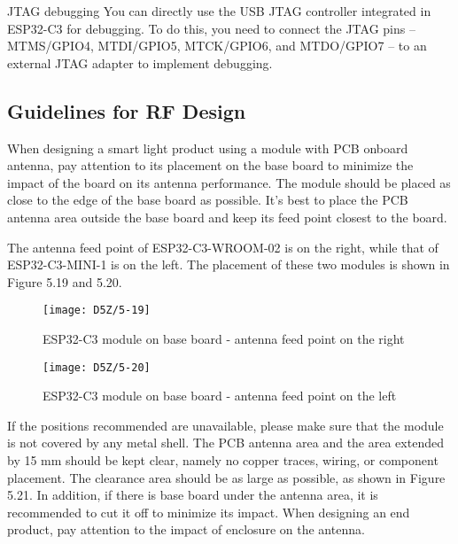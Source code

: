 \documentclass[a4paper,12pt]{book}
\begin{document}
\begin{term}{JTAG debugging}
    You can directly use the USB JTAG controller integrated in ESP32-C3 for debugging. To do this, you need to connect the JTAG pins – MTMS/GPIO4, MTDI/GPIO5, MTCK/GPIO6, and MTDO/GPIO7 – to an external JTAG adapter to implement debugging.
\end{term}

\subsection{Guidelines for RF Design}
When designing a smart light product using a module with PCB onboard antenna, pay attention to its placement on the base board to minimize the impact of the board on its antenna performance. The module should be placed as close to the edge of the base board as possible. It’s best to place the PCB antenna area outside the base board and keep its feed point closest to the board.

The antenna feed point of ESP32-C3-WROOM-02 is on the right, while that of ESP32-C3-MINI-1 is on the left. The placement of these two modules is shown in Figure 5.19 and 5.20.

\begin{figure}[h!]
    \centering
    \texttt{[image: D5Z/5-19]}
    \caption{ESP32-C3 module on base board - antenna feed point on the right}
\end{figure}

\begin{figure}[h!]
    \centering
    \texttt{[image: D5Z/5-20]}
    \caption{ESP32-C3 module on base board - antenna feed point on the left}
\end{figure}


If the positions recommended are unavailable, please make sure that the module is not covered by any metal shell. The PCB antenna area and the area extended by 15 mm should be kept clear, namely no copper traces, wiring, or component placement. The clearance area should be as large as possible, as shown in Figure 5.21. In addition, if there is base board under the antenna area, it is recommended to cut it off to minimize its impact. When designing an end product, pay attention to the impact of enclosure on the antenna.
\end{document}
